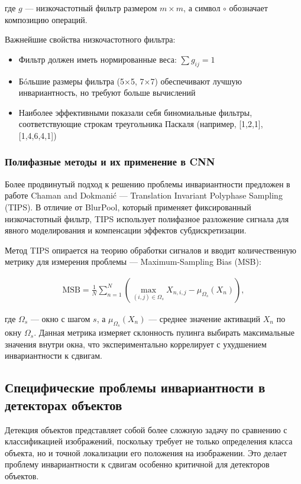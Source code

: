где $g$ — низкочастотный фильтр размером $m \times m$, а символ $\circ$ обозначает композицию операций.

Важнейшие свойства низкочастотного фильтра:
\begin{itemize}
    \item Фильтр должен иметь нормированные веса: $\sum g_{ij} = 1$
    \item Бóльшие размеры фильтра (5×5, 7×7) обеспечивают лучшую инвариантность, но требуют больше вычислений
    \item Наиболее эффективными показали себя биномиальные фильтры, соответствующие строкам треугольника Паскаля (например, [1,2,1], [1,4,6,4,1])
\end{itemize}

\subsubsection{Полифазные методы и их применение в CNN}
\label{sec:antialias:tips_and_applications}

Более продвинутый подход к решению проблемы инвариантности предложен в работе Chaman and Dokmanić \cite{Chaman2021} — Translation Invariant Polyphase Sampling (TIPS). В отличие от BlurPool, который применяет фиксированный низкочастотный фильтр, TIPS использует полифазное разложение сигнала для явного моделирования и компенсации эффектов субдискретизации.

Метод TIPS опирается на теорию обработки сигналов и вводит количественную метрику для измерения проблемы — Maximum-Sampling Bias (MSB):

\begin{multline}
  \text{MSB} = \frac{1}{N}\sum_{n=1}^{N}\left(\max_{(i,j)\in\Omega_s}X_{n,i,j} - \mu_{\Omega_s}(X_n)\right),
\end{multline}

где $\Omega_s$ — окно с шагом $s$, а $\mu_{\Omega_s}(X_n)$ — среднее значение активаций $X_n$ по окну $\Omega_s$. Данная метрика измеряет склонность пулинга выбирать максимальные значения внутри окна, что экспериментально коррелирует с ухудшением инвариантности к сдвигам.

\subsection{Специфические проблемы инвариантности в детекторах объектов}
\label{sec:detectors}

Детекция объектов представляет собой более сложную задачу по сравнению с классификацией изображений, поскольку требует не только определения класса объекта, но и точной локализации его положения на изображении. Это делает проблему инвариантности к сдвигам особенно критичной для детекторов объектов.

